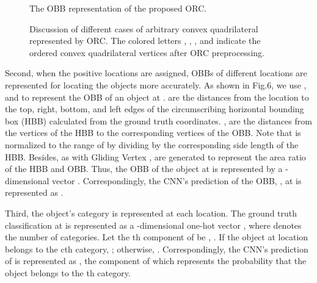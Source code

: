 \begin{figure}[tp]
	\vspace{-1em}
	\centering
	\vspace{-1em}
	\caption{The OBB representation of the proposed ORC.}
	\label{fig:6}
	\vspace{-1em}
\end{figure}

\begin{figure}[tp]
	\vspace{-1.5em}
	\centering
	\vspace{-1em}
	\caption{Discussion of different cases of arbitrary convex quadrilateral represented by ORC. The colored letters , , , and  indicate the ordered convex quadrilateral vertices after ORC preprocessing.}
	\label{fig:6_A}
	\vspace{-1em}
\end{figure}

Second, when the positive locations are assigned, OBBs of different locations are represented for locating the objects more accurately. As shown in Fig.6, we use , and  to represent the OBB of an object at .  are the distances from the location  to the top, right, bottom, and left edges of the circumscribing horizontal bounding box (HBB) calculated from the ground truth coordinates. , are the distances from the vertices of the HBB to the corresponding vertices of the OBB. Note that  is normalized to the range of  by dividing by the corresponding side length of the HBB. Besides, as with Gliding Vertex \cite{xu2020gliding},  are generated to represent the area ratio of the HBB and OBB. Thus, the OBB of the object at  is represented by a -dimensional vector . Correspondingly, the CNN’s prediction of the OBB, , at  is represented as . 

Third, the object’s category is represented at each location. The ground truth classification at  is represented as a -dimensional one-hot vector , where  denotes the number of categories. Let the th component of  be , . If the object at location  belongs to the cth category, ; otherwise, . Correspondingly, the CNN’s prediction of  is represented as , the component  of which represents the probability that the object belongs to the th category. 

